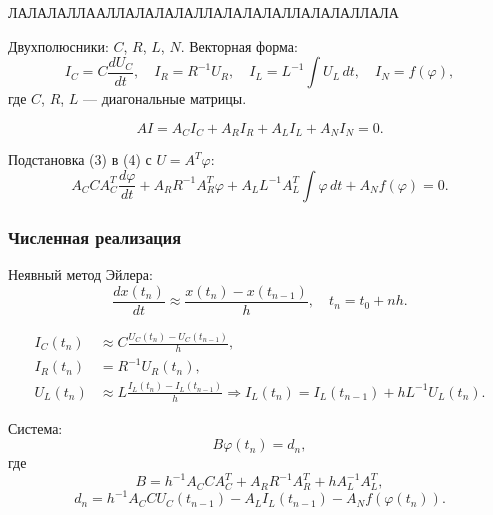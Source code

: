 	ЛАЛАЛАЛЛААЛЛАЛАЛАЛАЛЛАЛАЛАЛАЛЛАЛАЛАЛЛАЛА
	
	Двухполюсники: $C$, $R$, $L$, $N$. Векторная форма:
	\begin{equation}
		I_C = C \frac{d U_C}{dt}, \quad I_R = R^{-1} U_R, \quad I_L = L^{-1} \int U_L \, dt, \quad I_N = f(\varphi),
	\end{equation}
	где $C$, $R$, $L$ — диагональные матрицы.
	
	\begin{equation}
		A I = A_C I_C + A_R I_R + A_L I_L + A_N I_N = 0.
	\end{equation}
	
	Подстановка (3) в (4) с $U = A^T \varphi$:
	\begin{equation}
		A_C C A_C^T \frac{d \varphi}{dt} + A_R R^{-1} A_R^T \varphi + A_L L^{-1} A_L^T \int \varphi \, dt + A_N f(\varphi) = 0.
	\end{equation}
	
	\subsubsection{Численная реализация}
	
	Неявный метод Эйлера:
	\begin{equation}
		\frac{d x(t_n)}{dt} \approx \frac{x(t_n) - x(t_{n-1})}{h}, \quad t_n = t_0 + n h.
	\end{equation}
	
	\begin{align}
		I_C(t_n) &\approx C \frac{U_C(t_n) - U_C(t_{n-1})}{h}, \\
		I_R(t_n) &= R^{-1} U_R(t_n), \\
		U_L(t_n) &\approx L \frac{I_L(t_n) - I_L(t_{n-1})}{h} \Rightarrow I_L(t_n) = I_L(t_{n-1}) + h L^{-1} U_L(t_n).
	\end{align}
	
	Система:
	\begin{equation}
		B \varphi(t_n) = d_n,
	\end{equation}
	где
	\begin{equation}
		B = h^{-1} A_C C A_C^T + A_R R^{-1} A_R^T + h A_L^{-1} A_L^T,
	\end{equation}
	\begin{equation}
		d_n = h^{-1} A_C C U_C(t_{n-1}) - A_L I_L(t_{n-1}) - A_N f(\varphi(t_n)).
	\end{equation}
	
